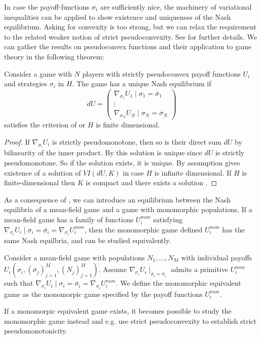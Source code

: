 In case the payoff-functions $\sigma_i$ are sufficiently nice, the machinery of variational inequalities can be applied to show existence and uniqueness of the Nash equilibrium. Asking for convexity is too strong, but we can relax the requirement to the related weaker notion of strict pseudoconvexity. See  for further details.
We can gather the results on pseudoconvex functions and their application to game theory in the following theorem:
\begin{theorem} \label{thm:nash_unique}
  Consider a game with $N$ players with strictly pseudoconvex payoff functions $U_i$ and strategies $\sigma_i$ in $H$. The game has a unique Nash equilibrium if
  \begin{equation}
    dU=
    \begin{pmatrix}
      \nabla_{\sigma_1} U_1\mid{\sigma_1 = \overbar{\sigma}_1}\\
      \vdots \\
      \nabla_{\sigma_N} U_N \mid{\sigma_N = \overbar{\sigma}_N}
    \end{pmatrix}
  \end{equation}
  satisfies the criterion of  or $H$ is finite dimensional.
\end{theorem}
\begin{proof}
   If $\nabla_{\sigma_i} U_i$ is strictly pseudomonotone, then so is their direct sum $dU$ by bilinearity of the inner product. By  this solution is unique since $dU$ is strictly pseudomonotone. So if the solution exists, it is unique. By assumption  gives existence of a solution of $VI(dU,K)$ in case $H$ is infinite dimensional. If $H$ is finite-dimensional then $K$ is compact and there exists a solution .
\end{proof}
As a consequence of , we can introduce an equilibrium between the Nash equilibria of a mean-field game and a game with monomorphic populations. If a mean-field game has a family of functions $U_i^{mon}$ satisfying $\nabla_{\sigma_i} U_i\mid{\sigma_i = \overbar{\sigma}_i} = \nabla_{\sigma_i} U_i^{mon}$, then the monomorphic game defined $U_i^{mon}$ has the same Nash equilbria, and can be studied equivalently.
\begin{definition}
  \label{def:correspondence}
  Consider a mean-field game with populations $N_1,\dots,N_M$ with individual payoffs $U_i(\sigma_i, (\overbar{\sigma}_j)_{j=1}^M, (N_j)_{j=1}^M)$. Assume $\nabla_{\sigma_i}U_i\mid_{\sigma_i=\overbar{\sigma}_i}$ admits a primitive $U_i^{mon}$ such that $\nabla_{\sigma_i} U_i\mid{\sigma_i = \overbar{\sigma}_i} = \nabla_{\sigma_i} U_i^{mon}$.
   We define the monomorphic equivalent game as the monomorpic game specified by the payoff functions $U_i^{mon}$.
\end{definition}
If a monomorpic equivalent game exists, it becomes possible to study the monomorphic game instead and e.g. use strict pseudoconvexity to establish strict pseudomonotonicity.

